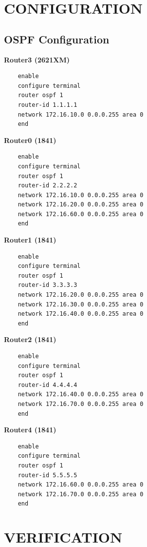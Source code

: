 \documentclass[12pt,a4paper]{article}
\begin{document}
\section*{CONFIGURATION}

\subsection*{OSPF Configuration}
\textbf{Router3 (2621XM)}
\begin{lstlisting}
	enable
	configure terminal
	router ospf 1
	router-id 1.1.1.1
	network 172.16.10.0 0.0.0.255 area 0
	end
\end{lstlisting}

\textbf{Router0 (1841)}
\begin{lstlisting}
	enable
	configure terminal
	router ospf 1
	router-id 2.2.2.2
	network 172.16.10.0 0.0.0.255 area 0
	network 172.16.20.0 0.0.0.255 area 0
	network 172.16.60.0 0.0.0.255 area 0
	end
\end{lstlisting}

\textbf{Router1 (1841)}
\begin{lstlisting}
	enable
	configure terminal
	router ospf 1
	router-id 3.3.3.3
	network 172.16.20.0 0.0.0.255 area 0
	network 172.16.30.0 0.0.0.255 area 0
	network 172.16.40.0 0.0.0.255 area 0
	end
\end{lstlisting}

\textbf{Router2 (1841)}
\begin{lstlisting}
	enable
	configure terminal
	router ospf 1
	router-id 4.4.4.4
	network 172.16.40.0 0.0.0.255 area 0
	network 172.16.70.0 0.0.0.255 area 0
	end
\end{lstlisting}

\textbf{Router4 (1841)}
\begin{lstlisting}
	enable
	configure terminal
	router ospf 1
	router-id 5.5.5.5
	network 172.16.60.0 0.0.0.255 area 0
	network 172.16.70.0 0.0.0.255 area 0
	end
\end{lstlisting}

\section*{VERIFICATION}
\end{document}

